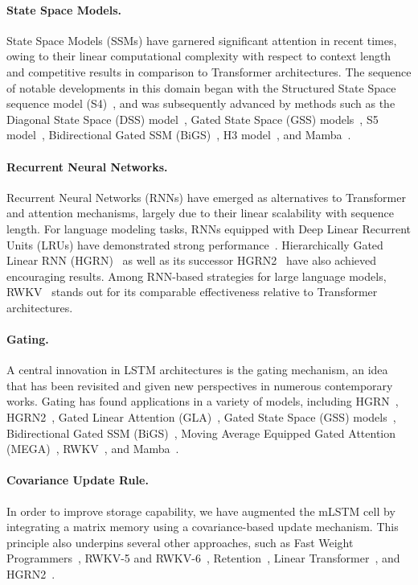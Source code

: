 \paragraph{State Space Models.} State Space Models (SSMs) have garnered significant attention in recent times, owing to their linear computational complexity with respect to context length and competitive results in comparison to Transformer architectures. The sequence of notable developments in this domain began with the Structured State Space sequence model (S4)~\citep{Gu:21}, and was subsequently advanced by methods such as the Diagonal State Space (DSS) model~\citep{Gupta:22}, Gated State Space (GSS) models~\citep{Mehta:22}, S5 model~\citep{Smith:22}, Bidirectional Gated SSM (BiGS)~\citep{Wang:22}, H3 model~\citep{Fu:23}, and Mamba~\citep{Gu:24arxiv}.

\paragraph{Recurrent Neural Networks.} Recurrent Neural Networks (RNNs) have emerged as alternatives to Transformer and attention mechanisms, largely due to their linear scalability with sequence length. For language modeling tasks, RNNs equipped with Deep Linear Recurrent Units (LRUs) have demonstrated strong performance~\citep{Orvieto:23, De:24arxiv}. Hierarchically Gated Linear RNN (HGRN)~\citep{Qin:23} as well as its successor HGRN2~\citep{Qin:24arxiv} have also achieved encouraging results. Among RNN-based strategies for large language models, RWKV~\citep{Peng:23arxivshort,Peng:24arxivshort} stands out for its comparable effectiveness relative to Transformer architectures.

\paragraph{Gating.}
A central innovation in LSTM architectures is the gating mechanism, an idea that has been revisited and given new perspectives in numerous contemporary works. Gating has found applications in a variety of models, including HGRN~\citep{Qin:23}, HGRN2~\citep{Qin:24arxiv}, Gated Linear Attention (GLA)~\citep{Yang:23arxiv}, Gated State Space (GSS) models~\citep{Mehta:22}, Bidirectional Gated SSM (BiGS)~\citep{Wang:22}, Moving Average Equipped Gated Attention (MEGA)~\citep{Ma:22}, RWKV~\citep{Peng:23arxivshort}, and Mamba~\citep{Gu:24arxiv}.

\paragraph{Covariance Update Rule.}  
In order to improve storage capability, we have augmented the mLSTM cell by integrating a matrix memory using a covariance-based update mechanism. This principle also underpins several other approaches, such as Fast Weight Programmers~\citep{Schmidhuber:92ncfastweights,Schlag:21}, RWKV-5 and RWKV-6~\citep{Peng:24arxivshort}, Retention~\citep{Sun:23arxiv}, Linear Transformer~\citep{Katharopoulos:20}, and HGRN2~\citep{Qin:24arxiv}.

